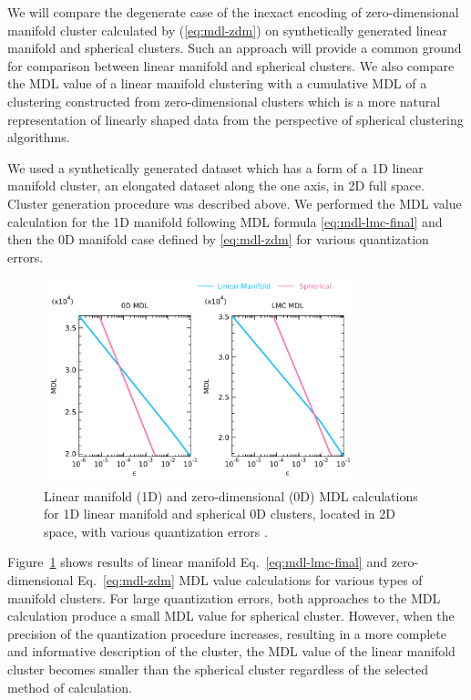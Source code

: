 We will compare the degenerate case of the inexact encoding of zero-dimensional
manifold cluster calculated by (\ref{eq:mdl-zdm}) on synthetically generated
linear manifold and spherical clusters. Such an approach will provide a common
ground for comparison between linear manifold and spherical clusters.
We also compare the MDL value of a linear manifold clustering with a cumulative
MDL of a clustering constructed from zero-dimensional clusters which is a more
natural representation of linearly shaped data from the perspective of spherical
clustering algorithms.

We used a synthetically generated dataset which has a form of a 1D linear manifold
cluster, an elongated dataset along the one axis, in 2D full space.
Cluster generation procedure was described above.
We performed the MDL value calculation for the 1D manifold following MDL formula
\eqref{eq:mdl-lmc-final} and then the 0D manifold case defined by \eqref{eq:mdl-zdm}
for various quantization errors.

\begin{figure}[ht]
\center
\includegraphics[width=3.5in]{img/zero-dim-mdl_zdc-mdl-exp1_1.pdf}
\caption{Linear manifold (1D) and zero-dimensional (0D) MDL calculations for 1D linear manifold and spherical 0D clusters, located in 2D space, with various quantization errors \textepsilon.}
\label{fig:zdc-mdl-exp1}
\end{figure}



Figure~\ref{fig:zdc-mdl-exp1} shows results of linear manifold Eq.~\eqref{eq:mdl-lmc-final}
and zero-dimensional Eq.~\eqref{eq:mdl-zdm} MDL value calculations for various types
of manifold clusters. For large quantization errors, both approaches to the MDL
calculation produce a small MDL value for spherical cluster. However, when
the precision of the quantization procedure increases, resulting in a more
complete and informative description of the cluster, the MDL value of the linear
manifold cluster becomes smaller than the spherical cluster regardless of
the selected method of calculation.

